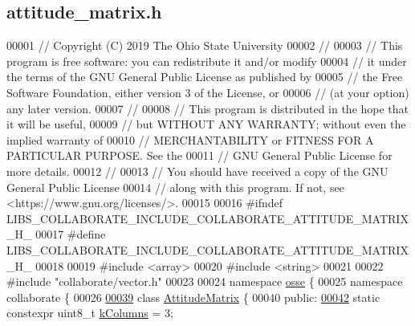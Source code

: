 \hypertarget{attitude__matrix_8h_source}{}\subsection{attitude\+\_\+matrix.\+h}
\label{attitude__matrix_8h_source}

\begin{DoxyCode}
00001 \textcolor{comment}{// Copyright (C) 2019 The Ohio State University}
00002 \textcolor{comment}{//}
00003 \textcolor{comment}{// This program is free software: you can redistribute it and/or modify}
00004 \textcolor{comment}{// it under the terms of the GNU General Public License as published by}
00005 \textcolor{comment}{// the Free Software Foundation, either version 3 of the License, or}
00006 \textcolor{comment}{// (at your option) any later version.}
00007 \textcolor{comment}{//}
00008 \textcolor{comment}{// This program is distributed in the hope that it will be useful,}
00009 \textcolor{comment}{// but WITHOUT ANY WARRANTY; without even the implied warranty of}
00010 \textcolor{comment}{// MERCHANTABILITY or FITNESS FOR A PARTICULAR PURPOSE.  See the}
00011 \textcolor{comment}{// GNU General Public License for more details.}
00012 \textcolor{comment}{//}
00013 \textcolor{comment}{// You should have received a copy of the GNU General Public License}
00014 \textcolor{comment}{// along with this program.  If not, see <https://www.gnu.org/licenses/>.}
00015 
00016 \textcolor{preprocessor}{#ifndef LIBS\_COLLABORATE\_INCLUDE\_COLLABORATE\_ATTITUDE\_MATRIX\_H\_}
00017 \textcolor{preprocessor}{#define LIBS\_COLLABORATE\_INCLUDE\_COLLABORATE\_ATTITUDE\_MATRIX\_H\_}
00018 
00019 \textcolor{preprocessor}{#include <array>}
00020 \textcolor{preprocessor}{#include <string>}
00021 
00022 \textcolor{preprocessor}{#include "collaborate/vector.h"}
00023 
00024 \textcolor{keyword}{namespace }\hyperlink{namespaceosse}{osse} \{
00025 \textcolor{keyword}{namespace }collaborate \{
00026 
\hyperlink{classosse_1_1collaborate_1_1_attitude_matrix}{00039} \textcolor{keyword}{class }\hyperlink{classosse_1_1collaborate_1_1_attitude_matrix}{AttitudeMatrix} \{
00040  \textcolor{keyword}{public}:
\hyperlink{classosse_1_1collaborate_1_1_attitude_matrix_a7d700f1773cb534bd9f807149ab6d8f7}{00042}   \textcolor{keyword}{static} constexpr uint8\_t \hyperlink{classosse_1_1collaborate_1_1_attitude_matrix_a7d700f1773cb534bd9f807149ab6d8f7}{kColumns} = 3;

\end{DoxyCode}
